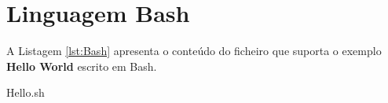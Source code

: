 \chapter{Linguagem Bash}
\label{ch:LangBash}

A Listagem \ref{lst:Bash} apresenta o conteúdo do ficheiro que suporta o exemplo \textbf{Hello World} escrito em Bash.


{Hello.sh}
